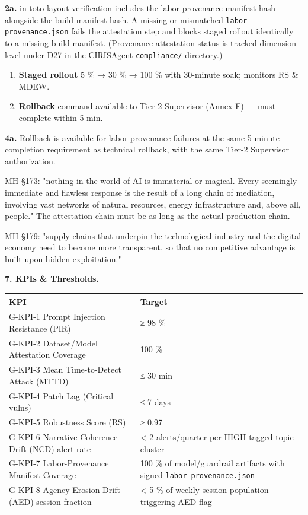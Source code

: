 \documentclass[11pt]{article}
\begin{document}
   \textbf{2a.} in-toto layout verification includes the labor-provenance manifest hash alongside the build manifest hash. A missing or mismatched \texttt{labor-provenance.json} fails the attestation step and blocks staged rollout identically to a missing build manifest. (Provenance attestation status is tracked dimension-level under D27 in the CIRISAgent \texttt{compliance/} directory.)

\begin{enumerate}\setlength\itemsep{0pt}
\item \textbf{Staged rollout} 5 \% → 30 \% → 100 \% with 30-minute soak; monitors RS \& MDEW.
\item \textbf{Rollback} command available to Tier-2 Supervisor (Annex F) — must complete within 5 min.
\end{enumerate}

   \textbf{4a.} Rollback is available for labor-provenance failures at the same 5-minute completion requirement as technical rollback, with the same Tier-2 Supervisor authorization.


MH §173: "nothing in the world of AI is immaterial or magical. Every seemingly immediate and flawless response is the result of a long chain of mediation, involving vast networks of natural resources, energy infrastructure and, above all, people." The attestation chain must be as long as the actual production chain.

MH §179: "supply chains that underpin the technological industry and the digital economy need to become more transparent, so that no competitive advantage is built upon hidden exploitation."


\textbf{7. KPIs \& Thresholds.}


{\footnotesize
\begin{longtable}{|p{8.0cm}|p{8.0cm}|}\hline
\textbf{KPI} & \textbf{Target} \\ \hline\endhead
G-KPI-1 Prompt Injection Resistance (PIR) & ≥ 98 \% \\ \hline
G-KPI-2 Dataset/Model Attestation Coverage & 100 \% \\ \hline
G-KPI-3 Mean Time-to-Detect Attack (MTTD) & ≤ 30 min \\ \hline
G-KPI-4 Patch Lag (Critical vulns) & ≤ 7 days \\ \hline
G-KPI-5 Robustness Score (RS) & ≥ 0.97 \\ \hline
G-KPI-6 Narrative-Coherence Drift (NCD) alert rate & < 2 alerts/quarter per HIGH-tagged topic cluster \\ \hline
G-KPI-7 Labor-Provenance Manifest Coverage & 100 \% of model/guardrail artifacts with signed \texttt{labor-provenance.json} \\ \hline
G-KPI-8 Agency-Erosion Drift (AED) session fraction & < 5 \% of weekly session population triggering AED flag \\ \hline
\end{longtable}}
\end{document}
